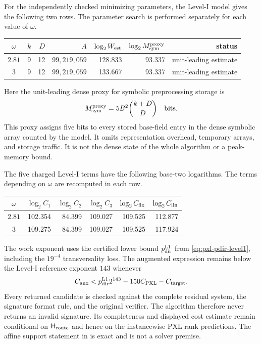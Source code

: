 \begin{theorem}
For the independently checked minimizing parameters, the Level-I model gives
the following two rows.  The parameter search is performed separately for
each value of $\omega$.
\begin{center}
\scriptsize
\begin{tabular}{@{}c r r r r r r@{}}
\toprule
$\omega$ & $k$ & $D$ & $A$ & $\log_2 W_{\rm est}$
& $\log_2 M_{\rm sym}^{\rm proxy}$ & status\\
\midrule
$2.81$ & 9 & 12 & $99{,}219{,}059$ & 128.833 & 93.337
& unit-leading estimate\\
$3$    & 9 & 12 & $99{,}219{,}059$ & 133.667 & 93.337
& unit-leading estimate\\
\bottomrule
\end{tabular}
\end{center}
Here the unit-leading dense proxy for symbolic preprocessing storage is
\begin{equation}
 M_{\rm sym}^{\rm proxy}=5B^2\binom{k+D}{D}\quad\text{bits}.
 \label{eq:pxl-symbolic-storage}
\end{equation}
This proxy assigns five bits to every stored base-field entry in the dense
symbolic array counted by the model.  It omits representation overhead,
temporary arrays, and storage traffic.  It is not the dense state of the
whole algorithm or a peak-memory bound.

The five charged Level-I terms have the following base-two logarithms.  The
terms depending on $\omega$ are recomputed in each row.
\begin{center}
\scriptsize
\begin{tabular}{@{}c r r r r r@{}}
\toprule
$\omega$ & $\log_2 C_1$ & $\log_2 C_2$ & $\log_2 C_3$
& $\log_2 C_{\rm fix}$ & $\log_2 C_{\rm lin}$\\
\midrule
$2.81$ & 102.354 & 84.399 & 109.027 & 109.525 & 112.877\\
$3$    & 109.275 & 84.399 & 109.027 & 109.525 & 117.924\\
\bottomrule
\end{tabular}
\end{center}
The work exponent uses the certified lower bound $p_{\rm dir}^{\rm L1}$ from
\eqref{eq:pxl-pdir-level1}, including the $19^{-4}$ transversality loss.
The augmented expression remains below the Level-I reference exponent $143$
whenever
\begin{equation}
 C_{\rm aux}
 <p_{\rm dir}^{\rm L1}2^{143}
  -150C_{\rm PXL}-C_{\rm target}.
 \label{eq:pxl-aux-threshold}
\end{equation}
Every returned candidate is checked against the complete residual system,
the signature format rule, and the original verifier.  The algorithm
therefore never returns an invalid signature.  Its completeness and displayed
cost estimate remain conditional on $\mathsf H_{\rm route}$ and hence on the
instancewise PXL rank predictions.  The affine support statement in
 is exact and is not a solver premise.
\end{theorem}

